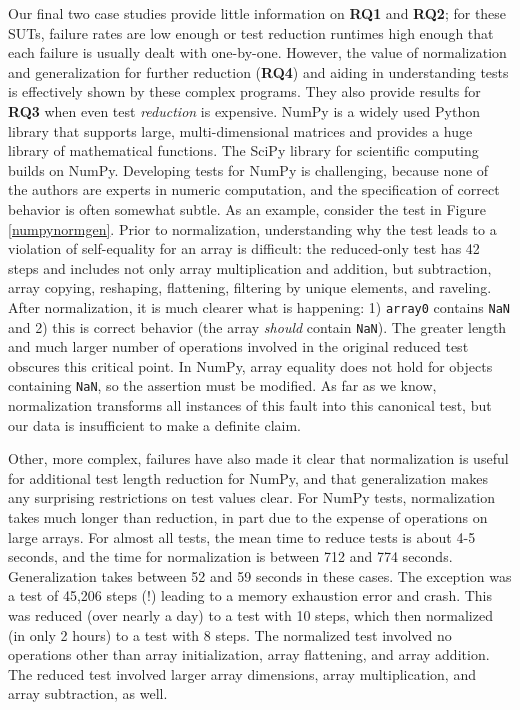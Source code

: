 Our final two case studies provide little information on {\bf RQ1} and
{\bf RQ2}; for these SUTs, failure rates are low enough or test
reduction runtimes high enough that each failure is usually dealt with
one-by-one.  However, the value of normalization and generalization
for further reduction ({\bf RQ4}) and aiding in understanding tests is effectively shown by these complex programs.  They also provide
results for {\bf RQ3} when even test \emph{reduction} is expensive.
NumPy \cite{NumPy} is a widely used Python library that
supports large, multi-dimensional matrices and provides a huge library
of mathematical functions.  The SciPy library for scientific
computing builds on NumPy.  Developing tests for NumPy is challenging,
because none of the authors are experts in numeric computation, and
the specification of correct behavior is often somewhat subtle.  As an
example, consider the test in Figure \ref{numpynormgen}.  Prior to
normalization, understanding why the test leads to a violation of
self-equality for an array is difficult: the reduced-only test has 42
steps and includes not only array multiplication and addition, but
subtraction, array copying, reshaping, flattening,  filtering by
unique elements, and raveling.  After
normalization, it is much clearer what is happening: 1) {\tt array0}
contains {\tt NaN} and 2) this is correct behavior (the array
\emph{should} contain {\tt NaN}).  The greater length and much larger
number of operations involved in the original reduced test
obscures this critical point.  In NumPy, array equality does not hold
for objects containing {\tt NaN}, so the assertion must be modified.
As far as we know, normalization transforms all instances of this
fault into this canonical test, but our data is insufficient to make a definite claim.

Other, more complex, failures have also made it clear that
normalization is useful for additional test length reduction for
NumPy, and that generalization makes any surprising restrictions on
test values clear.  For NumPy tests, normalization takes much longer
than reduction, in part due to the expense of operations on large
arrays.  For almost all tests, the mean time to reduce tests
is about 4-5 seconds, and the time for normalization is between 712
and 774 seconds.   Generalization takes
between 52 and 59 seconds in these cases.  The exception was a test of 45,206 steps (!)  leading to a memory exhaustion error and
crash.  This was reduced (over nearly a day) to a test
with 10 steps, which then normalized (in only 2 hours) to a test
with 8 steps.  The normalized test involved no operations other than array
initialization, array flattening, and array
addition.  The reduced test involved larger array dimensions, array
multiplication, and array subtraction, as well.  



